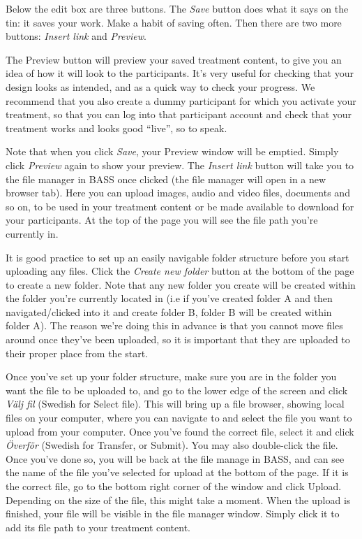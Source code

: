 \documentclass[]{book}
\begin{document}
Below the edit box are three buttons. The \emph{Save} button does what it says on the tin: it saves your work. Make a habit of saving often.
Then there are two more buttons: \emph{Insert link} and \emph{Preview}.

The Preview button will preview your saved treatment content, to give you an idea of how it will look to the participants. It's very useful for checking that your design looks as intended, and as a quick way to check your progress. We recommend that you also create a dummy participant for which you activate your treatment, so that you can log into that participant account and check that your treatment works and looks good ``live'', so to speak.

Note that when you click \emph{Save}, your Preview window will be emptied. Simply click \emph{Preview} again to show your preview.
The \emph{Insert link} button will take you to the file manager in BASS once clicked (the file manager will open in a new browser tab). Here you can upload images, audio and video files, documents and so on, to be used in your treatment content or be made available to download for your participants. At the top of the page you will see the file path you're currently in.

It is good practice to set up an easily navigable folder structure before you start uploading any files. Click the \emph{Create new folder} button at the bottom of the page to create a new folder. Note that any new folder you create will be created within the folder you're currently located in (i.e if you've created folder A and then navigated/clicked into it and create folder B, folder B will be created within folder A). The reason we're doing this in advance is that you cannot move files around once they've been uploaded, so it is important that they are uploaded to their proper place from the start.

Once you've set up your folder structure, make sure you are in the folder you want the file to be uploaded to, and go to the lower edge of the screen and click \emph{Välj fil} (Swedish for Select file). This will bring up a file browser, showing local files on your computer, where you can navigate to and select the file you want to upload from your computer. Once you've found the correct file, select it and click \emph{Överför} (Swedish for Transfer, or Submit). You may also double-click the file. Once you've done so, you will be back at the file manage in BASS, and can see the name of the file you've selected for upload at the bottom of the page. If it is the correct file, go to the bottom right corner of the window and click Upload. Depending on the size of the file, this might take a moment. When the upload is finished, your file will be visible in the file manager window. Simply click it to add its file path to your treatment content.
\end{document}
